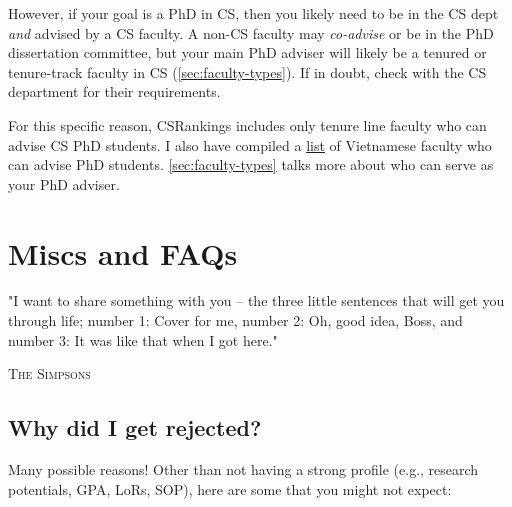 \documentclass[oneside,11pt,dvipsnames]{book}
\begin{document}
However, if your goal is a PhD in CS, then you likely need to be in the CS dept \emph{and} advised by a CS faculty. A non-CS faculty may \emph{co-advise} or be in the PhD dissertation committee, but your main PhD adviser will likely be a tenured or tenure-track faculty in CS (\autoref{sec:faculty-types}). If in doubt, check with the CS department for their requirements.

For this specific reason,  CSRankings includes only tenure line faculty who can advise CS PhD students. I also have compiled a \href{https://github.com/dynaroars/dynaroars.github.io/wiki/Viet-CS-Profs-US}{list} of Vietnamese faculty who can advise PhD students. \autoref{sec:faculty-types} talks more about who can serve as your PhD adviser.


\chapter{Miscs and FAQs}
\epigraph{"I want to share something with you – the three little sentences that will get you through life; number 1: Cover for me, number 2: Oh, good idea, Boss, and number 3: It was like that when I got here."}{\textsc{The Simpsons}}

\section{Why did I get rejected?}\label{sec:why-rejected}
Many possible reasons!  Other than not having a strong profile (e.g., research potentials, GPA, LoRs, SOP), here are some that you might not expect:
\end{document}
